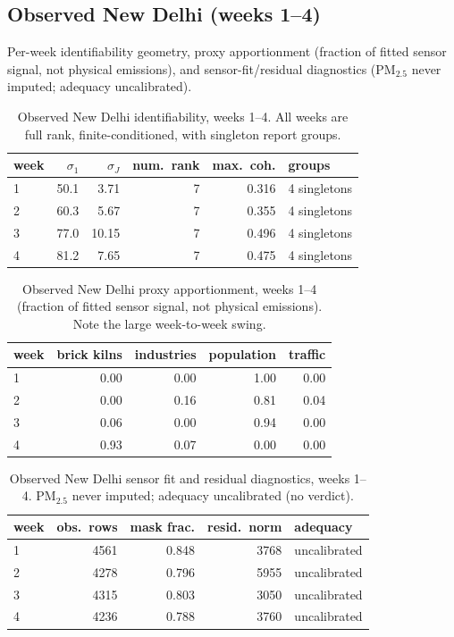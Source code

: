 \subsection{Observed New Delhi (weeks 1--4)}
Per-week identifiability geometry, proxy apportionment (fraction of fitted sensor
signal, not physical emissions), and sensor-fit/residual diagnostics (PM$_{2.5}$
never imputed; adequacy uncalibrated).
\begin{table}[t]
\centering
\footnotesize
\caption{Observed New Delhi identifiability, weeks 1--4. All weeks are full rank,
finite-conditioned, with singleton report groups.}
\label{tab:results_nd_ident}
\begin{tabular}{lrrrrl}
\toprule
week & $\sigma_1$ & $\sigma_J$ & num.\ rank & max.\ coh. & groups \\
\midrule
1 & 50.1 & 3.71  & 7 & 0.316 & 4 singletons \\
2 & 60.3 & 5.67  & 7 & 0.355 & 4 singletons \\
3 & 77.0 & 10.15 & 7 & 0.496 & 4 singletons \\
4 & 81.2 & 7.65  & 7 & 0.475 & 4 singletons \\
\bottomrule
\end{tabular}
\end{table}
\begin{table}[t]
\centering
\footnotesize
\caption{Observed New Delhi proxy apportionment, weeks 1--4 (fraction of fitted
sensor signal, not physical emissions). Note the large week-to-week swing.}
\label{tab:results_nd_appt}
\begin{tabular}{lrrrr}
\toprule
week & brick kilns & industries & population & traffic \\
\midrule
1 & 0.00 & 0.00 & 1.00 & 0.00 \\
2 & 0.00 & 0.16 & 0.81 & 0.04 \\
3 & 0.06 & 0.00 & 0.94 & 0.00 \\
4 & 0.93 & 0.07 & 0.00 & 0.00 \\
\bottomrule
\end{tabular}
\end{table}
\begin{table}[t]
\centering
\footnotesize
\caption{Observed New Delhi sensor fit and residual diagnostics, weeks 1--4.
PM$_{2.5}$ never imputed; adequacy uncalibrated (no verdict).}
\label{tab:results_nd_resid}
\begin{tabular}{lrrrl}
\toprule
week & obs.\ rows & mask frac. & resid.\ norm & adequacy \\
\midrule
1 & 4561 & 0.848 & 3768 & uncalibrated \\
2 & 4278 & 0.796 & 5955 & uncalibrated \\
3 & 4315 & 0.803 & 3050 & uncalibrated \\
4 & 4236 & 0.788 & 3760 & uncalibrated \\
\bottomrule
\end{tabular}
\end{table}

